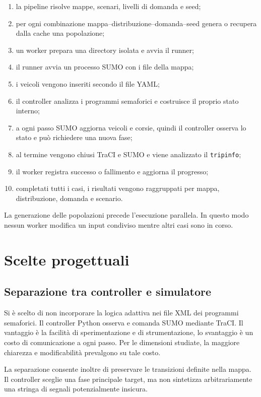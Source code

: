 \documentclass[12pt,a4paper,oneside]{report}
\numberwithin{equation}{chapter}
\begin{document}
\begin{enumerate}
    \item la pipeline risolve mappe, scenari, livelli di domanda e seed;
    \item per ogni combinazione mappa--distribuzione--domanda--seed genera o
    recupera dalla cache una popolazione;
    \item un worker prepara una directory isolata e avvia il runner;
    \item il runner avvia un processo SUMO con i file della mappa;
    \item i veicoli vengono inseriti secondo il file YAML;
    \item il controller analizza i programmi semaforici e costruisce il proprio
    stato interno;
    \item a ogni passo SUMO aggiorna veicoli e corsie, quindi il controller
    osserva lo stato e può richiedere una nuova fase;
    \item al termine vengono chiusi TraCI e SUMO e viene analizzato il
    \texttt{tripinfo};
    \item il worker registra successo o fallimento e aggiorna il progresso;
    \item completati tutti i casi, i risultati vengono raggruppati per mappa,
    distribuzione, domanda e scenario.
\end{enumerate}

La generazione delle popolazioni precede l'esecuzione parallela. In questo modo
nessun worker modifica un input condiviso mentre altri casi sono in corso.

\section{Scelte progettuali}

\subsection{Separazione tra controller e simulatore}

Si è scelto di non incorporare la logica adattiva nei file XML dei programmi
semaforici. Il controller Python osserva e comanda SUMO mediante TraCI. Il
vantaggio è la facilità di sperimentazione e di strumentazione, lo svantaggio è
un costo di comunicazione a ogni passo. Per le dimensioni studiate, la maggiore
chiarezza e modificabilità prevalgono su tale costo.

La separazione consente inoltre di preservare le transizioni definite nella
mappa. Il controller sceglie una fase principale target, ma non sintetizza
arbitrariamente una stringa di segnali potenzialmente insicura.
\end{document}
